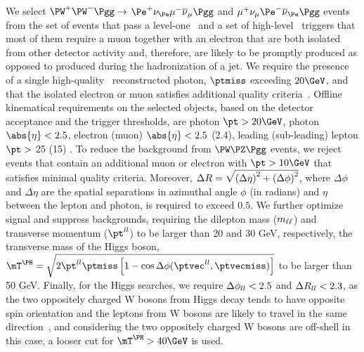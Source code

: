 We select $\PW^+\PW^-\Pgg\to$ $\Pe^+\nu_{\Pe}\mu^-\overline{\nu}_{\mu}\Pgg$ and $\mu^+\nu_{\mu}\Pe^-\overline{\nu}_{\Pe}\Pgg$ events from the set of events that pass a level-one~\cite{Sirunyan:2020zal} and a set of  high-level~\cite{Khachatryan:2016bia} triggers that most of them require a muon together with an electron that are both isolated from other detector activity and, therefore, are likely to be promptly produced as opposed to produced during the hadronization of a jet. We require the presence of a single high-quality~\cite{CMS:EGM-14-001} reconstructed photon, $\ptmiss$ exceeding $20\GeV$, and that the isolated electron or muon satisfies additional quality criteria~\cite{Sirunyan:2018,Khachatryan:2015hwa}. Offline kinematical requirements on the selected objects, based on the detector acceptance and the trigger thresholds, are photon $\pt > 20\GeV$, photon $\abs{\eta} < 2.5$, electron (muon) $\abs{\eta}< 2.5$ (2.4), leading (sub-leading) lepton $\pt > $ 25 (15) \GeV. To reduce the background from $\PW\PZ\Pgg$ events, we reject events that contain an additional muon or electron with $\pt > 10\GeV$ that satisfies minimal quality criteria. Moreover, $\Delta R = \sqrt{\smash[b]{\left(\Delta\eta\right)^2 + \left(\Delta\phi\right)^2}}$, where $\Delta \phi$ and $\Delta \eta$ are the spatial separations in azimuthal angle $\phi$ (in radians) and $\eta$ between the lepton and photon, is required to exceed $0.5$. We further optimize signal and suppress backgrounds, requiring the dilepton mass ($m_{\ell\ell}$) and transverse momentum ($\ptll$) to be larger than 20 and 30 GeV, respectively, the transverse mass of the Higgs boson, $\mTH = \sqrt{2 \ptll \ptmiss \left[1 - \cos\Delta\phi(\ptvecll, \ptvecmiss)\right]}$ to be larger than 50 GeV. Finally, for the Higgs searches, we require $\Delta\phi_{ll}<2.5$ and $\Delta R_{ll}<2.3$, as the two oppositely charged W bosons from Higgs decay tends to have opposite spin orientation and the leptons from W bosons are likely to travel in the same direction~\cite{Dittmar:1996ss}, and considering the two oppositely charged W bosons are off-shell in this case, a looser cut for $\mTH > 40\GeV$ is used.


